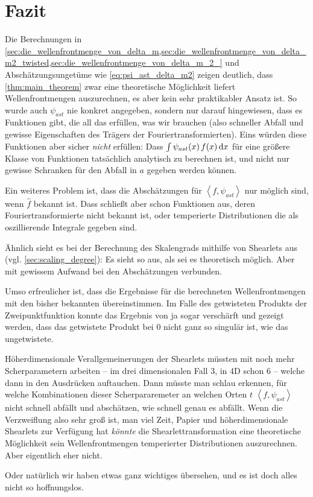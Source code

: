 
\section{Fazit} %
\label{sec:fazit_fuer_physiker}

Die Berechnungen in \cref{sec:die_wellenfrontmenge_von_delta_m,sec:die_wellenfrontmenge_von_delta_m2_twisted,sec:die_wellenfrontmenge_von_delta_m_2_} und Abschätzungsungetüme wie \cref{eq:psi_ast_delta_m2} zeigen deutlich, dass \cref{thm:main_theorem} zwar eine theoretische Möglichkeit liefert Wellenfrontmengen auszurechnen, es aber kein sehr praktikabler Ansatz ist. So wurde auch $\psi_{ast}$ nie konkret angegeben, sondern nur darauf hingewiesen, dass es Funktionen gibt, die all das erfüllen, was wir brauchen (also schneller Abfall und gewisse Eigenschaften des Trägers der Fouriertransformierten). Eins würden diese Funktionen aber sicher \emph{nicht} erfüllen: Dass $\int \psi_{ast}(x)\,f(x) \mathop{}\!\mathrm{d} x$ für eine größere Klasse von Funktionen tatsächlich analytisch zu berechnen ist, und nicht nur gewisse Schranken für den Abfall in $a$ gegeben werden können.

Ein weiteres Problem ist, dass die Abschätzungen für $\left<f, \psi_{ast}\right>$ nur möglich sind, wenn $\hat f$ bekannt ist. Dass schließt aber schon Funktionen aus, deren Fouriertransformierte nicht bekannt ist, oder temperierte Distributionen die als oszillierende Integrale gegeben sind.

Ähnlich sieht es bei der Berechnung des Skalengrads mithilfe von Shearlets aus (vgl. \cref{sec:scaling_degree}): Es sieht so aus, als sei es theoretisch möglich. Aber mit gewissem Aufwand bei den Abschätzungen verbunden.

Umso erfreulicher ist, dass die Ergebnisse für die berechneten Wellenfrontmengen mit den bisher bekannten übereinstimmen. Im Falle des getwisteten Produkts der Zweipunktfunktion konnte das Ergebnis von \textcite{Schulz2014} ja sogar verschärft und gezeigt werden, dass das getwistete Produkt bei $0$ nicht ganz so singulär ist, wie das ungetwistete.

Höherdimensionale Verallgemeinerungen der Shearlets müssten mit noch mehr Scherparametern arbeiten -- im drei dimensionalen Fall 3, in 4D schon  6 -- welche dann in den Ausdrücken auftauchen. Dann müsste man schlau erkennen, für welche Kombinationen dieser Scherpararemeter an welchen Orten $t$ $\left< f, \psi_{ast} \right>$ nicht schnell abfällt und abschätzen, wie schnell genau es abfällt.
Wenn die Verzweiflung also sehr groß ist, man viel Zeit, Papier und höherdimensionale Shearlets zur Verfügung hat \emph{könnte} die Shearlettransformation eine theoretische Möglichkeit sein Wellenfrontmengen temperierter Distributionen auszurechnen. Aber eigentlich eher nicht.

Oder natürlich wir haben etwas ganz wichtiges übersehen, und es ist doch alles nicht so hoffnungslos.

